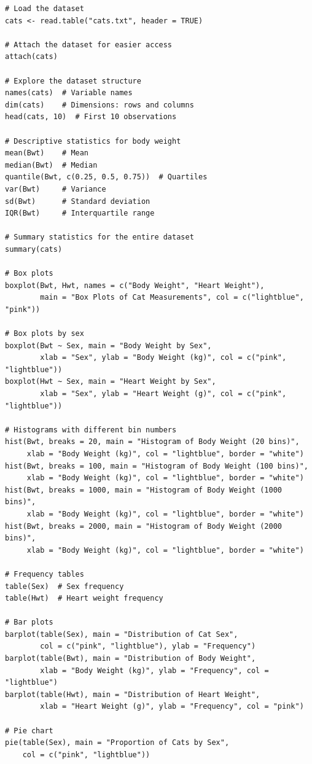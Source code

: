 \documentclass[a4paper,12pt]{article}
\begin{document}
\begin{lstlisting}[caption={Complete R code for statistical analysis}, label={lst:complete_code}]
# Load the dataset
cats <- read.table("cats.txt", header = TRUE)

# Attach the dataset for easier access
attach(cats)

# Explore the dataset structure
names(cats)  # Variable names
dim(cats)    # Dimensions: rows and columns
head(cats, 10)  # First 10 observations

# Descriptive statistics for body weight
mean(Bwt)    # Mean
median(Bwt)  # Median
quantile(Bwt, c(0.25, 0.5, 0.75))  # Quartiles
var(Bwt)     # Variance
sd(Bwt)      # Standard deviation
IQR(Bwt)     # Interquartile range

# Summary statistics for the entire dataset
summary(cats)

# Box plots
boxplot(Bwt, Hwt, names = c("Body Weight", "Heart Weight"),
        main = "Box Plots of Cat Measurements", col = c("lightblue", "pink"))

# Box plots by sex
boxplot(Bwt ~ Sex, main = "Body Weight by Sex", 
        xlab = "Sex", ylab = "Body Weight (kg)", col = c("pink", "lightblue"))
boxplot(Hwt ~ Sex, main = "Heart Weight by Sex", 
        xlab = "Sex", ylab = "Heart Weight (g)", col = c("pink", "lightblue"))

# Histograms with different bin numbers
hist(Bwt, breaks = 20, main = "Histogram of Body Weight (20 bins)",
     xlab = "Body Weight (kg)", col = "lightblue", border = "white")
hist(Bwt, breaks = 100, main = "Histogram of Body Weight (100 bins)",
     xlab = "Body Weight (kg)", col = "lightblue", border = "white")
hist(Bwt, breaks = 1000, main = "Histogram of Body Weight (1000 bins)",
     xlab = "Body Weight (kg)", col = "lightblue", border = "white")
hist(Bwt, breaks = 2000, main = "Histogram of Body Weight (2000 bins)",
     xlab = "Body Weight (kg)", col = "lightblue", border = "white")

# Frequency tables
table(Sex)  # Sex frequency
table(Hwt)  # Heart weight frequency

# Bar plots
barplot(table(Sex), main = "Distribution of Cat Sex",
        col = c("pink", "lightblue"), ylab = "Frequency")
barplot(table(Bwt), main = "Distribution of Body Weight",
        xlab = "Body Weight (kg)", ylab = "Frequency", col = "lightblue")
barplot(table(Hwt), main = "Distribution of Heart Weight",
        xlab = "Heart Weight (g)", ylab = "Frequency", col = "pink")

# Pie chart
pie(table(Sex), main = "Proportion of Cats by Sex",
    col = c("pink", "lightblue"))


\end{lstlisting}
\end{document}
